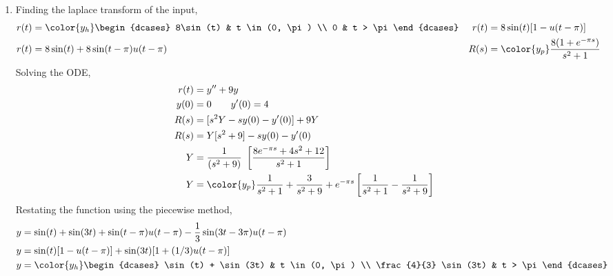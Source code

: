 \begin{enumerate}
    \item Finding the laplace transform of the input,
          \begin{align}
              r(t)                         & = \color{y_h}
              \begin{dcases}
                  8\sin(t) & t \in (0, \pi) \\
                  0        & t > \pi
              \end{dcases} &
              r(t)                         & = 8\sin(t)[1 - u(t - \pi)]          \\
              r(t)                         & = 8\sin(t) + 8\sin(t-\pi)u(t-\pi) &
              R(s)                         & = \color{y_p} \frac{8(1
                  + e^{-\pi s})}{s^2 + 1}
          \end{align}
          Solving the ODE,
          \begin{align}
              r(t) & = y'' + 9y                                          \\
              y(0) & = 0 \qquad y'(0) = 4                                \\
              R(s) & = [s^2Y - sy(0) - y'(0)] + 9Y                       \\
              R(s) & = Y[s^2 + 9] - s y(0) - y'(0)                       \\
              Y    & = \frac{1}{(s^2 + 9)}\ \left[
              \frac{8e^{-\pi s} + 4s^2 + 12}{s^2 + 1}\right]             \\
              Y    & = \color{y_p} \frac{1}{s^2 + 1} + \frac{3}{s^2 + 9}
              + e^{-\pi s}\left[ \frac{1}{s^2 + 1} - \frac{1}{s^2 + 9} \right]
          \end{align}
          Restating the function using the piecewise method,
          \begin{align}
              y & = \sin(t) + \sin(3t)
              + \sin(t-\pi)u(t - \pi) - \frac{1}{3} \sin(3t - 3\pi)u(t - \pi) \\
              y & = \sin(t)[1 - u(t - \pi)]
              + \sin(3t) [1 + (1/3)u(t - \pi)]                                \\
              y & = \color{y_h}
              \begin{dcases}
                  \sin(t) + \sin(3t)   & t \in (0, \pi) \\
                  \frac{4}{3} \sin(3t) & t > \pi
              \end{dcases}
          \end{align}


\end{enumerate}
